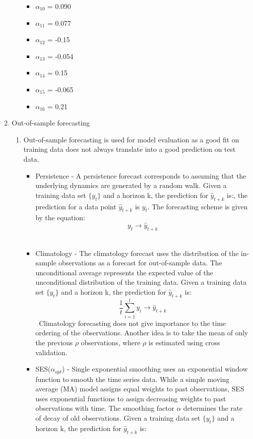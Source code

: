 \documentclass{article}
\begin{document}
\begin{enumerate}[label=1.\arabic*]
\begin{enumerate}[label=(\alph*)]
\begin{itemize}
    \item $\alpha_{10}$ = 0.090
    \item $\alpha_{11}$ = 0.077
    \item $\alpha_{12}$ = -0.15
    \item $\alpha_{13}$ = -0.054
    \item $\alpha_{14}$ = 0.15
    \item $\alpha_{15}$ = -0.065
    \item $\alpha_{16}$ = 0.21
\end{itemize}
\end{enumerate}
\item Out-of-sample forecasting
\begin{enumerate}[label=(\alph*)]
\item Out-of-sample forecasting is used for model evaluation as a good fit on training data does not always translate into a good prediction on test data. 
\begin{itemize}
    \item Persistence - A persistence forecast corresponds to assuming that the underlying dynamics are generated by a random walk. Given a training data set $\{y_t\}$ and a horizon k, the prediction for $\hat{y}_{t+k}$ is:, the prediction for a data point $\hat{y}_{t+k}$ is $y_t$.  The forecasting scheme is given by the equation:  
      \[y_t \rightarrow \hat{y}_{t+k}\]\
 \item Climatology - The climatology forecast uses the distribution of the in-sample observations as a forecast for out-of-sample data. The unconditional average represents the expected value of the unconditional distribution of the training data. Given a training data set $\{y_t\}$ and a horizon k, the prediction for $\hat{y}_{t+k}$ is:
    \[\frac{1}{t}\sum_{i=1}^{t}{y_i}\rightarrow\hat{y}_{t+k} \]\
    Climatology forecasting does not give importance to the time ordering of the observations. Another idea is to take the mean of only the previous $\rho$ observations, where $\rho$ is estimated using cross validation.
    \item SES($\alpha_{opt}$) - Single exponential smoothing uses an exponential window function to smooth the time series data. While a simple moving average (MA) model assigns equal weights to past observations, SES uses exponential functions to assign decreasing weights to past observations with time. The smoothing factor $\alpha$ determines the rate of decay of old observations. Given a training data set $\{y_t\}$ and a horizon k, the prediction for $\hat{y}_{t+k}$ is:

\end{itemize}
\end{enumerate}
\end{enumerate}
\end{document}
